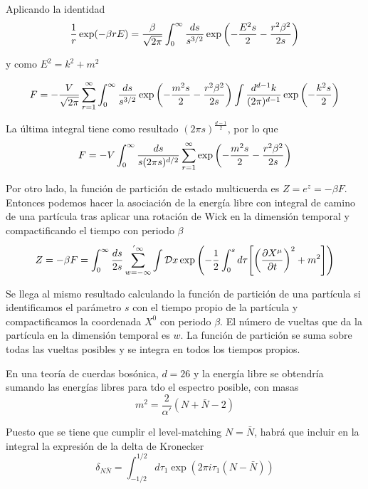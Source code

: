 Aplicando la identidad
\begin{equation}
  \frac 1 r \exp(-\beta r E)=\frac{\beta}{\sqrt{2\pi}}\int_0^\infty \frac{ds}{s^{3/2}}\exp\qty(-\frac{E^2s}{2}-\frac{r^2\beta^2}{2s})
\end{equation}

y como $E^2=k^2+m^2$

\begin{equation}
  F=-\frac{V}{\sqrt{2\pi}}\sum^\infty_{r=1} \int_0^\infty \frac{ds}{s^{3/2}} \exp \qty(-\frac{m^2s}{2} -\frac{r^2\beta^2}{2s})
  \int \frac{d^{d-1}k}{(2\pi)^{d-1}}\exp\qty(-\frac{k^2s}{2})
\end{equation}

La última integral tiene como resultado $(2\pi s)^{\frac{d-1}{2}}$, por lo que
\begin{equation}
  F=-V \int_0^\infty \frac{ds}{s(2\pi s)^{d/2}}\sum^\infty_{r=1} \exp \qty(-\frac{m^2s}{2}- \frac{r^2\beta^2}{2s})
\end{equation}

Por otro lado, la función de partición de estado multicuerda es $Z=e^z=-\beta F$. 
Entonces podemos hacer la asociación de la energía libre con integral de camino de 
una partícula tras aplicar una rotación de Wick en la dimensión temporal y compactificando el
tiempo con periodo $\beta$
\begin{equation}
  Z=-\beta F= \int_0^\infty \frac{ds}{2s}\sum^{'\infty}_{w=-\infty} \int \mathcal{D}x 
  \exp\qty(-\frac 1 2 \int_0^s d\tau \qty[\qty(\pdv{X^\mu}{t})^2+m^2])
\end{equation}

Se llega al mismo resultado calculando la función de partición de una partícula  si identificamos 
el parámetro $s$ con el tiempo propio  de la partícula y compactificamos 
la coordenada $X^0$ con periodo $\beta$. El número de vueltas que da la
partícula en la dimensión temporal es $w$. La función de partición se suma sobre
todas las vueltas posibles y se integra en todos los tiempos propios.

En una teoría de cuerdas bosónica, $d=26$ y la energía libre se obtendría sumando las
energías libres para tdo el espectro posible, con masas
\begin{equation}
  m^2=\frac{2}{\alpha'}(N+\bar N-2)
\end{equation}

Puesto que se tiene que cumplir el level-matching $N=\bar N$, habrá que incluir en la 
integral la expresión de la delta de Kronecker
\begin{equation}
   \delta_{N\bar N}=\int_{-1/2}^{1/2}d\tau_1 \exp(2\pi i\tau_1 (N-\bar N))
\end{equation}


